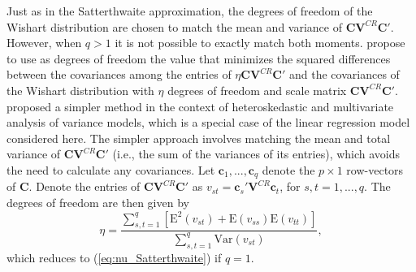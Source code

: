 \documentclass[12pt]{article}\usepackage[]{graphicx}\usepackage[]{color}
\newcommand{\E}{\text{E}}
\newcommand{\Var}{\text{Var}}
\newcommand{\bm}{\mathbf}
\begin{document}
Just as in the Satterthwaite approximation, the degrees of freedom of the Wishart distribution are chosen to match the mean and variance of $\bm{C}\bm{V}^{CR} \bm{C}'$. 
However, when $q > 1$ it is not possible to exactly match both moments. 
\cite{Pan2002small} propose to use as degrees of freedom the value that minimizes the squared differences between the covariances among the entries of $\eta \bm{C}\bm{V}^{CR}\bm{C}'$ and the covariances of the Wishart distribution with $\eta$ degrees of freedom and scale matrix $\bm{C}\bm{V}^{CR}\bm{C}'$. 
\citet{Zhang2012two-wayANOVA, Zhang2012MANOVA, Zhang2013tests} proposed a simpler method in the context of heteroskedastic and multivariate analysis of variance models, which is a special case of the linear regression model considered here. 
The simpler approach involves matching the mean and total variance of $\bm{C}\bm{V}^{CR}\bm{C}'$ (i.e., the sum of the variances of its entries), which avoids the need to calculate any covariances.
Let $\bm{c}_1,...,\bm{c}_q$ denote the $p \times 1$ row-vectors of $\bm{C}$.
Denote the entries of $\bm{C}\bm{V}^{CR}\bm{C}'$ as $v_{st} = \bm{c}_s'\bm{V}^{CR}\bm{c}_t$, for $s,t=1,...,q$. 
The degrees of freedom are then given by 
\begin{equation}
\label{eq:eta_totalvariance}
\eta = \frac{\sum_{s,t=1}^q \left[\E^2\left(v_{st}\right) + \E\left(v_{ss}\right)\E\left(v_{tt}\right)\right]}{\sum_{s,t=1}^q \Var\left(v_{st}\right)},
\end{equation}
which reduces to (\ref{eq:nu_Satterthwaite}) if $q = 1$.
\end{document}
